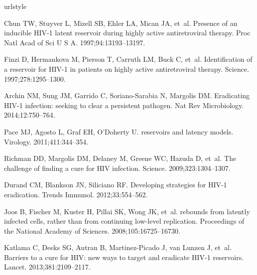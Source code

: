 \documentclass{bmcart}
\begin{document}
\begin{backmatter}


\begin{thebibliography}{10}
\expandafter\ifx\csname urlstyle\endcsname\relax
  \providecommand{\doi}[1]{doi:\discretionary{}{}{}#1}\else
  \providecommand{\doi}{doi:\discretionary{}{}{}\begingroup
  \urlstyle{rm}\Url}\fi

Chun TW, Stuyver L, Mizell SB, Ehler LA, Mican JA, et~al.
\newblock Presence of an inducible {HIV-1} latent reservoir during highly
  active antiretroviral therapy.
\newblock Proc Natl Acad of Sci U S A. 1997;\hspace{0pt}94:13193--13197.

Finzi D, Hermankova M, Pierson T, Carruth LM, Buck C, et~al.
\newblock Identification of a reservoir for {HIV-1} in patients on highly
  active antiretroviral therapy.
\newblock Science. 1997;\hspace{0pt}278:1295--1300.

Archin NM, Sung JM, Garrido C, Soriano-Sarabia N, Margolis DM.
\newblock Eradicating {HIV-1} infection: seeking to clear a persistent
  pathogen.
\newblock Nat Rev Microbiology. 2014;\hspace{0pt}12:750--764.

Pace MJ, Agosto L, Graf EH, O'Doherty U.
 reservoirs and latency models.
\newblock Virology. 2011;\hspace{0pt}411:344--354.

Richman DD, Margolis DM, Delaney M, Greene WC, Hazuda D, et~al.
\newblock The challenge of finding a cure for {HIV} infection.
\newblock Science. 2009;\hspace{0pt}323:1304--1307.

Durand CM, Blankson JN, Siliciano RF.
\newblock Developing strategies for {HIV-1} eradication.
\newblock Trends Immunol. 2012;\hspace{0pt}33:554--562.

Joos B, Fischer M, Kuster H, Pillai SK, Wong JK, et~al.
 rebounds from latently infected cells, rather than from
  continuing low-level replication.
\newblock Proceedings of the National Academy of Sciences.
  2008;\hspace{0pt}105:16725--16730.

Katlama C, Deeks SG, Autran B, Martinez-Picado J, van Lunzen J, et~al.
\newblock Barriers to a cure for {HIV}: new ways to target and eradicate
  {HIV-1} reservoirs.
\newblock Lancet. 2013;\hspace{0pt}381:2109--2117.


\end{thebibliography}
\end{backmatter}
\end{document}
